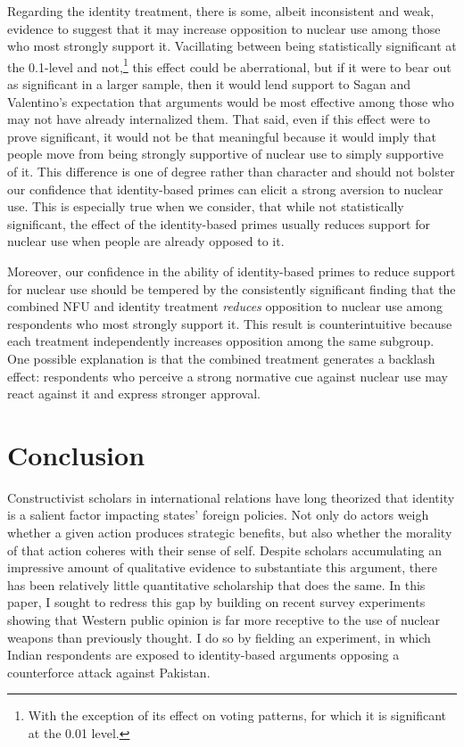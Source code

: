 \documentclass[12pt]{article}
\begin{document}
Regarding the identity treatment, there is some, albeit inconsistent and weak, evidence to suggest that it may increase opposition to nuclear use among those who most strongly support it. Vacillating between being statistically significant at the 0.1-level and not,\footnote{With the exception of its effect on voting patterns, for which it is significant at the 0.01 level.} this effect could be aberrational, but if it were to bear out as significant in a larger sample, then it would lend support to Sagan and Valentino's expectation that arguments would be most effective among those who may not have already internalized them. That said, even if this effect were to prove significant, it would not be that meaningful because it would imply that people move from being strongly supportive of nuclear use to simply supportive of it. This difference is one of degree rather than character and should not bolster our confidence that identity-based primes can elicit a strong aversion to nuclear use. This is especially true when we consider, that while not statistically significant, the effect of the identity-based primes usually reduces support for nuclear use when people are already opposed to it.

Moreover, our confidence in the ability of identity-based primes to reduce support for nuclear use should be tempered by the consistently significant finding that the combined NFU and identity treatment \textit{reduces} opposition to nuclear use among respondents who most strongly support it. This result is counterintuitive because each treatment independently increases opposition among the same subgroup. One possible explanation is that the combined treatment generates a backlash effect: respondents who perceive a strong normative cue against nuclear use may react against it and express stronger approval.

\section{Conclusion}

Constructivist scholars in international relations have long theorized that identity is a salient factor impacting states' foreign policies. Not only do actors weigh whether a given action produces strategic benefits, but also whether the morality of that action coheres with their sense of self. Despite scholars accumulating an impressive amount of qualitative evidence to substantiate this argument, there has been relatively little quantitative scholarship that does the same. In this paper, I sought to redress this gap by building on recent survey experiments showing that Western public opinion is far more receptive to the use of nuclear weapons than previously thought. I do so by fielding an experiment, in which Indian respondents are exposed to identity-based arguments opposing a counterforce attack against Pakistan.
\end{document}
